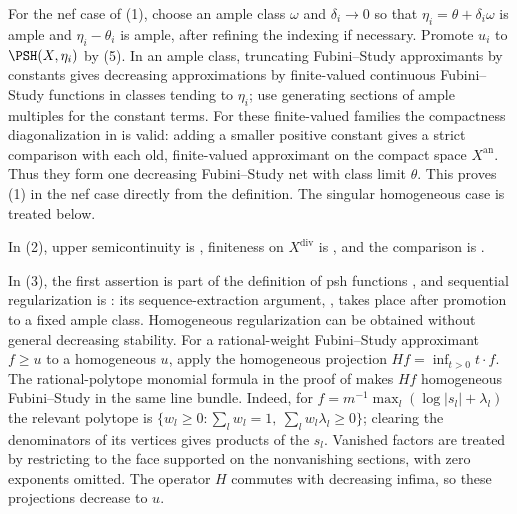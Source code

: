 \documentclass[11pt,a4paper]{article}
\newcommand{\an}{\mathrm{an}}          %
\newcommand{\divv}{\mathrm{div}}       %
\begin{document}
For the nef case of (1), choose an ample class $\omega$ and $\delta_i\to0$ so that $\eta_i=\theta+\delta_i\omega$ is ample and $\eta_i-\theta_i$ is ample, after refining the indexing if necessary. Promote $u_i$ to $\PSH(X,\eta_i)$ by (5). In an ample class, truncating Fubini--Study approximants by constants gives decreasing approximations by finite-valued continuous Fubini--Study functions in classes tending to $\eta_i$; use generating sections of ample multiples for the constant terms. For these finite-valued families the compactness diagonalization in \cite[Lemma~4.6]{BJ22} is valid: adding a smaller positive constant gives a strict comparison with each old, finite-valued approximant on the compact space $X^{\an}$. Thus they form one decreasing Fubini--Study net with class limit $\theta$. This proves (1) in the nef case directly from the definition. The singular homogeneous case is treated below.

In (2), upper semicontinuity is \cite[Proposition~4.12(i)]{BJ22}, finiteness on $X^{\divv}$ is \cite[Proposition~1.28 and Corollary~4.17]{BJ22}, and the comparison is \cite[Theorem~4.22]{BJ22}.

In (3), the first assertion is part of the definition of psh functions \cite[Definition~4.1]{BJ22}, and sequential regularization is \cite[Corollary~12.18]{BJ22}: its sequence-extraction argument, \cite[Theorem~12.16]{BJ22}, takes place after promotion to a fixed ample class. Homogeneous regularization can be obtained without general decreasing stability. For a rational-weight Fubini--Study approximant $f\ge u$ to a homogeneous $u$, apply the homogeneous projection $Hf=\inf_{t>0}t\mathbin\cdot f$. The rational-polytope monomial formula in the proof of \cite[Theorem~6.15]{BJ22} makes $Hf$ homogeneous Fubini--Study in the same line bundle. Indeed, for $f=m^{-1}\max_l(\log|s_l|+\lambda_l)$ the relevant polytope is $\{w_l\ge0:\sum_lw_l=1,\ \sum_lw_l\lambda_l\ge0\}$; clearing the denominators of its vertices gives products of the $s_l$. Vanished factors are treated by restricting to the face supported on the nonvanishing sections, with zero exponents omitted. The operator $H$ commutes with decreasing infima, so these projections decrease to $u$.
\end{document}
